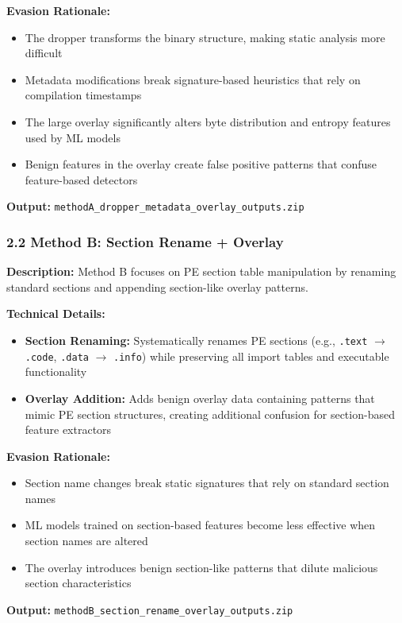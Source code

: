 \documentclass[12pt,letterpaper]{article}
\begin{document}
\textbf{Evasion Rationale:}
\begin{itemize}
    \item The dropper transforms the binary structure, making static analysis more difficult
    \item Metadata modifications break signature-based heuristics that rely on compilation timestamps
    \item The large overlay significantly alters byte distribution and entropy features used by ML models
    \item Benign features in the overlay create false positive patterns that confuse feature-based detectors
\end{itemize}

\textbf{Output:} \texttt{methodA\_dropper\_metadata\_overlay\_outputs.zip}

\subsubsection*{2.2 Method B: Section Rename + Overlay}

\textbf{Description:} Method B focuses on PE section table manipulation by renaming standard sections and appending section-like overlay patterns.

\textbf{Technical Details:}
\begin{itemize}
    \item \textbf{Section Renaming:} Systematically renames PE sections (e.g., \texttt{.text} $\rightarrow$ \texttt{.code}, \texttt{.data} $\rightarrow$ \texttt{.info}) while preserving all import tables and executable functionality
    \item \textbf{Overlay Addition:} Adds benign overlay data containing patterns that mimic PE section structures, creating additional confusion for section-based feature extractors
\end{itemize}

\textbf{Evasion Rationale:}
\begin{itemize}
    \item Section name changes break static signatures that rely on standard section names
    \item ML models trained on section-based features become less effective when section names are altered
    \item The overlay introduces benign section-like patterns that dilute malicious section characteristics
\end{itemize}

\textbf{Output:} \texttt{methodB\_section\_rename\_overlay\_outputs.zip}
\end{document}
